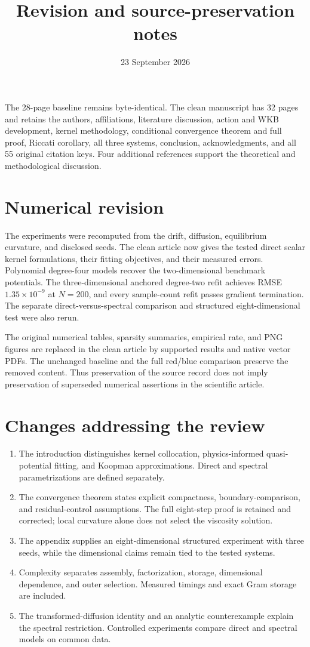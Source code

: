 \documentclass[11pt,a4paper]{article}
\title{Revision and source-preservation notes}\author{}\date{23 September 2026}
\begin{document}
\maketitle
The 28-page baseline  remains byte-identical. The clean manuscript has 32 pages and retains the authors, affiliations, literature discussion, action and WKB development, kernel methodology, conditional convergence theorem and full proof, Riccati corollary, all three systems, conclusion, acknowledgments, and all 55 original citation keys. Four additional references support the theoretical and methodological discussion.

\section*{Numerical revision}
The experiments were recomputed from the drift, diffusion, equilibrium curvature, and disclosed seeds. The clean article now gives the tested direct scalar kernel formulations, their fitting objectives, and their measured errors. Polynomial degree-four models recover the two-dimensional benchmark potentials. The three-dimensional anchored degree-two refit achieves RMSE $1.35\times10^{-9}$ at $N=200$, and every sample-count refit passes gradient termination. The separate direct-versus-spectral comparison and structured eight-dimensional test were also rerun.

The original numerical tables, sparsity summaries, empirical rate, and PNG figures are replaced in the clean article by supported results and native vector PDFs. The unchanged baseline and the full red/blue comparison preserve the removed content. Thus preservation of the source record does not imply preservation of superseded numerical assertions in the scientific article.

\section*{Changes addressing the review}
\begin{enumerate}
\item The introduction distinguishes kernel collocation, physics-informed quasi-potential fitting, and Koopman approximations. Direct and spectral parametrizations are defined separately.
\item The convergence theorem states explicit compactness, boundary-comparison, and residual-control assumptions. The full eight-step proof is retained and corrected; local curvature alone does not select the viscosity solution.
\item The appendix supplies an eight-dimensional structured experiment with three seeds, while the dimensional claims remain tied to the tested systems.
\item Complexity separates assembly, factorization, storage, dimensional dependence, and outer selection. Measured timings and exact Gram storage are included.
\item The transformed-diffusion identity and an analytic counterexample explain the spectral restriction. Controlled experiments compare direct and spectral models on common data.
\end{enumerate}
\end{document}
